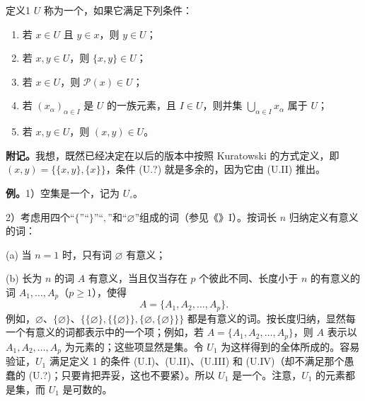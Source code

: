\begin{SGAresult}{定义}{1}
 $U$ 称为一个，如果它满足下列条件：
\begin{enumerate}
\item[(U.I)] 若 $x\in U$ 且 $y\in x$，则 $y\in U$；
\item[(U.II)] 若 $x,y\in U$，则 $\{x,y\}\in U$；
\item[(U.III)] 若 $x\in U$，则 $\mathcal P(x)\in U$；
\item[(U.IV)] 若 $(x_\alpha)_{\alpha\in I}$ 是 $U$ 的一族元素，且 $I\in U$，则并集 $\bigcup_{\alpha\in I}x_\alpha$ 属于 $U$；
\item[(U.?)] 若 $x,y\in U$，则 $(x,y)\in U$。
\end{enumerate}
\end{SGAresult}
\textbf{附记。}我想，既然已经决定在以后的版本中按照 Kuratowski 的方式定义，即 $(x,y)=\{\{x,y\},\{x\}\}$，条件 (U.?) 就是多余的，因为它由 (U.II) 推出。

\textbf{例。}1）空集是一个，记为 $U_\circ$。

2）考虑用四个“$\{$”“$\}$”“$,$”和“$\varnothing$”组成的词（参见《》I）。按词长 $n$ 归纳定义有意义的词：

(a) 当 $n=1$ 时，只有词 $\varnothing$ 有意义；

(b) 长为 $n$ 的词 $A$ 有意义，当且仅当存在 $p$ 个彼此不同、长度小于 $n$ 的有意义的词 $A_1,\ldots,A_p$（$p\geq1$），使得
\[
 A=\{A_1,A_2,\ldots,A_p\}.
\]
例如，$\varnothing$、$\{\varnothing\}$、$\{\{\varnothing\},\{\{\varnothing\}\},\{\varnothing,\{\varnothing\}\}\}$ 都是有意义的词。按长度归纳，显然每一个有意义的词都表示中的一个项；例如，若 $A=\{A_1,A_2,\ldots,A_p\}$，则 $A$ 表示以 $A_1,A_2,\ldots,A_p$ 为元素的；这些项显然是集。令 $U_1$ 为这样得到的全体所成的。容易验证，$U_1$ 满足定义 1 的条件 (U.I)、(U.II)、(U.III) 和 (U.IV)（却不满足那个愚蠢的 (U.?)；只要肯把弄妥，这也不要紧）。所以 $U_1$ 是一个。注意，$U_1$ 的元素都是集，而 $U_1$ 是可数的。

